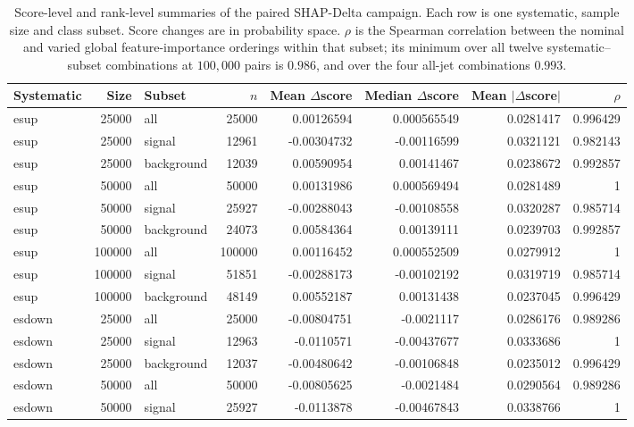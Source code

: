 \begin{table}[!ht]
\centering
\small
\caption{Score-level and rank-level summaries of the paired SHAP-Delta campaign. Each row is one systematic, sample size and class subset. Score changes are in probability space. $\rho$ is the Spearman correlation between the nominal and varied global feature-importance orderings within that subset; its minimum over all twelve systematic--subset combinations at $100{,}000$ pairs is $0.986$, and over the four all-jet combinations $0.993$.}
\label{tab:supp-shap-scores}
\begin{tabular}{l r l r rrr r}
\toprule
Systematic & Size & Subset & $n$ & Mean $\Delta$score & Median $\Delta$score & Mean $|\Delta$score$|$ & $\rho$ \\
\midrule
esup & 25000 & all & 25000 & 0.00126594 & 0.000565549 & 0.0281417 & 0.996429 \\
esup & 25000 & signal & 12961 & -0.00304732 & -0.00116599 & 0.0321121 & 0.982143 \\
esup & 25000 & background & 12039 & 0.00590954 & 0.00141467 & 0.0238672 & 0.992857 \\
esup & 50000 & all & 50000 & 0.00131986 & 0.000569494 & 0.0281489 & 1 \\
esup & 50000 & signal & 25927 & -0.00288043 & -0.00108558 & 0.0320287 & 0.985714 \\
esup & 50000 & background & 24073 & 0.00584364 & 0.00139111 & 0.0239703 & 0.992857 \\
esup & 100000 & all & 100000 & 0.00116452 & 0.000552509 & 0.0279912 & 1 \\
esup & 100000 & signal & 51851 & -0.00288173 & -0.00102192 & 0.0319719 & 0.985714 \\
esup & 100000 & background & 48149 & 0.00552187 & 0.00131438 & 0.0237045 & 0.996429 \\
esdown & 25000 & all & 25000 & -0.00804751 & -0.0021117 & 0.0286176 & 0.989286 \\
esdown & 25000 & signal & 12963 & -0.0110571 & -0.00437677 & 0.0333686 & 1 \\
esdown & 25000 & background & 12037 & -0.00480642 & -0.00106848 & 0.0235012 & 0.996429 \\
esdown & 50000 & all & 50000 & -0.00805625 & -0.0021484 & 0.0290564 & 0.989286 \\
esdown & 50000 & signal & 25927 & -0.0113878 & -0.00467843 & 0.0338766 & 1 \\

\end{tabular}
\end{table}
